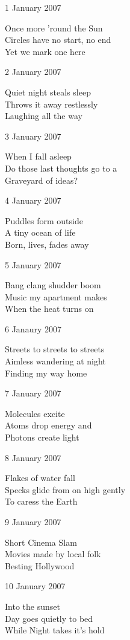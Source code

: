 \documentclass[12pt]{article}
\begin{document}
\setlength{\parskip}{1mm}

1 January 2007

Once more 'round the Sun \\
Circles have no start, no end \\
Yet we mark one here


\newpage

2 January 2007

Quiet night steals sleep \\
Throws it away restlessly \\
Laughing all the way

3 January 2007

When I fall asleep \\
Do those last thoughts go to a \\
Graveyard of ideas?

4 January 2007

Puddles form outside \\
A tiny ocean of life \\
Born, lives, fades away 

5 January 2007

Bang clang shudder boom \\
Music my apartment makes \\
When the heat turns on

6 Janaury 2007

Streets to streets to streets \\
Aimless wandering at night \\
Finding my way home

7 January 2007

Molecules excite \\
Atoms drop energy and \\
Photons create light


\newpage

8 January 2007

Flakes of water fall \\
Specks glide from on high gently \\
To caress the Earth

9 January 2007

Short Cinema Slam \\
Movies made by local folk \\
Besting Hollywood 

10 January 2007

Into the sunset \\
Day goes quietly to bed \\
While Night takes it's hold 
\end{document}
